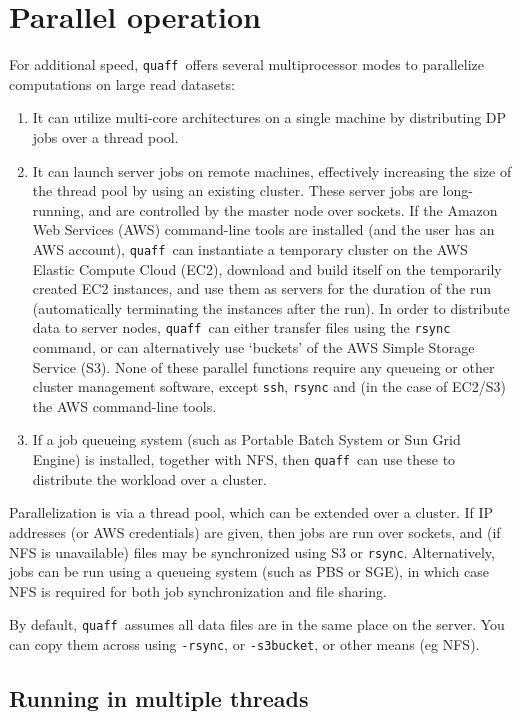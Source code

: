 \documentclass{article}
\newcommand\quaff{{\tt quaff}}
\newcommand\opt[1]{{\tt -#1}}
\begin{document}
\section{Parallel operation}


For additional speed, \quaff\ offers several multiprocessor modes to parallelize computations on large read datasets:
\begin{enumerate}
\item It can utilize multi-core architectures on a single machine by distributing DP jobs over a thread pool.
\item It can launch server jobs on remote machines, effectively increasing the size of the thread pool by using an existing cluster. These server jobs are long-running, and are controlled by the master node over sockets. If the Amazon Web Services (AWS) command-line tools are installed (and the user has an AWS account), \quaff\ can instantiate a temporary cluster on the AWS Elastic Compute Cloud (EC2), download and build itself on the temporarily created EC2 instances, and use them as servers for the duration of the run (automatically terminating the instances after the run). In order to distribute data to server nodes, \quaff\ can either transfer files using the {\tt rsync} command, or can alternatively use `buckets' of the AWS Simple Storage Service (S3). None of these parallel functions require any queueing or other cluster management software, except {\tt ssh}, {\tt rsync} and (in the case of EC2/S3) the AWS command-line tools.
\item If a job queueing system (such as Portable Batch System or Sun Grid Engine) is installed, together with NFS, then \quaff\ can use these to distribute the workload over a cluster.
\end{enumerate}

Parallelization is via a thread pool, which can be extended over a cluster.
If IP addresses (or AWS credentials) are given, then jobs are run over sockets,
and (if NFS is unavailable) files may be synchronized using S3 or {\tt rsync}.
Alternatively, jobs can be run using a queueing system (such as PBS or SGE),
in which case NFS is required for both job synchronization and file sharing.

By default, \quaff\ assumes all data files are in the same place on the server.
You can copy them across using \opt{rsync}, or \opt{s3bucket}, or other means (eg NFS).

\subsection{Running in multiple threads}
\end{document}
